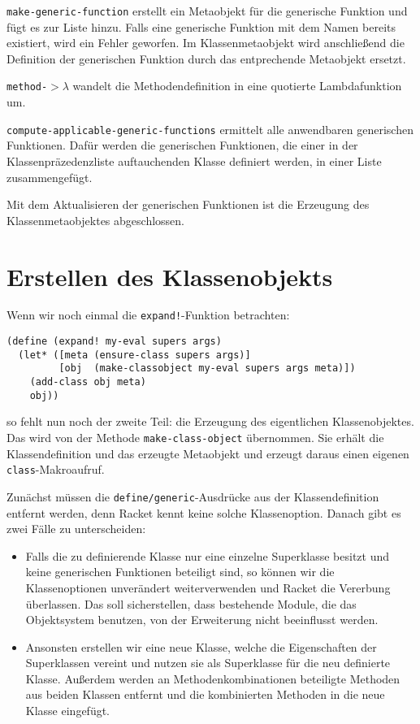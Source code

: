 \texttt{make-generic-function} erstellt ein Metaobjekt für die generische Funktion und fügt es zur Liste hinzu. Falls eine generische Funktion mit dem Namen bereits existiert, wird ein Fehler geworfen. Im Klassenmetaobjekt wird anschließend die Definition der generischen Funktion durch das entprechende Metaobjekt ersetzt.

\texttt{method-$>\lambda$} wandelt die Methodendefinition in eine quotierte Lambdafunktion um.

\texttt{compute-applicable-generic-functions} ermittelt alle anwendbaren generischen Funktionen. Dafür werden die generischen Funktionen, die einer in der Klassenpräzedenzliste auftauchenden Klasse definiert werden, in einer Liste zusammengefügt.

Mit dem Aktualisieren der generischen Funktionen ist die Erzeugung des Klassenmetaobjektes abgeschlossen.

\section{Erstellen des Klassenobjekts}

Wenn wir noch einmal die \texttt{expand!}-Funktion betrachten:

\begin{lstlisting}
(define (expand! my-eval supers args)
  (let* ([meta (ensure-class supers args)]
         [obj  (make-classobject my-eval supers args meta)])
    (add-class obj meta)
    obj))
\end{lstlisting}

so fehlt nun noch der zweite Teil: die Erzeugung des eigentlichen Klassenobjektes. Das wird von der Methode \texttt{make-class-object} übernommen. Sie erhält die Klassendefinition und das erzeugte Metaobjekt und erzeugt daraus einen eigenen \texttt{class}-Makroaufruf.

Zunächst müssen die \texttt{define/generic}-Ausdrücke aus der Klassendefinition entfernt werden, denn Racket kennt keine solche Klassenoption. Danach gibt es zwei Fälle zu unterscheiden:
\begin{itemize}
 \item Falls die zu definierende Klasse nur eine einzelne Superklasse besitzt und keine generischen Funktionen beteiligt sind, so können wir die Klassenoptionen unverändert weiterverwenden und Racket die Vererbung überlassen. Das soll sicherstellen, dass bestehende Module, die das Objektsystem benutzen, von der Erweiterung nicht beeinflusst werden.
 \item Ansonsten erstellen wir eine neue Klasse, welche die Eigenschaften der Superklassen vereint und nutzen sie als Superklasse für die neu definierte Klasse. Außerdem werden an  Methodenkombinationen beteiligte Methoden aus beiden Klassen entfernt und die kombinierten Methoden in die neue Klasse eingefügt.
\end{itemize}

